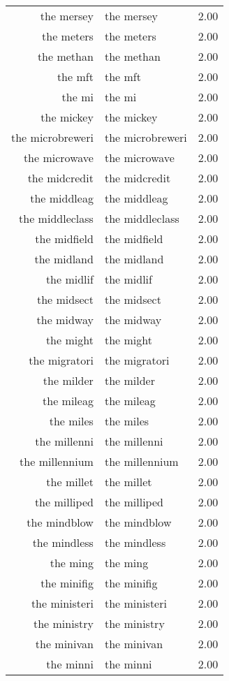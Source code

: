 \begin{table}[ht]
\begin{tabular}{rlr}
  the mersey & the mersey & 2.00 \\ 
  the meters & the meters & 2.00 \\ 
  the methan & the methan & 2.00 \\ 
  the mft & the mft & 2.00 \\ 
  the mi & the mi & 2.00 \\ 
  the mickey & the mickey & 2.00 \\ 
  the microbreweri & the microbreweri & 2.00 \\ 
  the microwave & the microwave & 2.00 \\ 
  the midcredit & the midcredit & 2.00 \\ 
  the middleag & the middleag & 2.00 \\ 
  the middleclass & the middleclass & 2.00 \\ 
  the midfield & the midfield & 2.00 \\ 
  the midland & the midland & 2.00 \\ 
  the midlif & the midlif & 2.00 \\ 
  the midsect & the midsect & 2.00 \\ 
  the midway & the midway & 2.00 \\ 
  the might & the might & 2.00 \\ 
  the migratori & the migratori & 2.00 \\ 
  the milder & the milder & 2.00 \\ 
  the mileag & the mileag & 2.00 \\ 
  the miles & the miles & 2.00 \\ 
  the millenni & the millenni & 2.00 \\ 
  the millennium & the millennium & 2.00 \\ 
  the millet & the millet & 2.00 \\ 
  the milliped & the milliped & 2.00 \\ 
  the mindblow & the mindblow & 2.00 \\ 
  the mindless & the mindless & 2.00 \\ 
  the ming & the ming & 2.00 \\ 
  the minifig & the minifig & 2.00 \\ 
  the ministeri & the ministeri & 2.00 \\ 
  the ministry & the ministry & 2.00 \\ 
  the minivan & the minivan & 2.00 \\ 
  the minni & the minni & 2.00 \\ 

\end{tabular}
\end{table}
